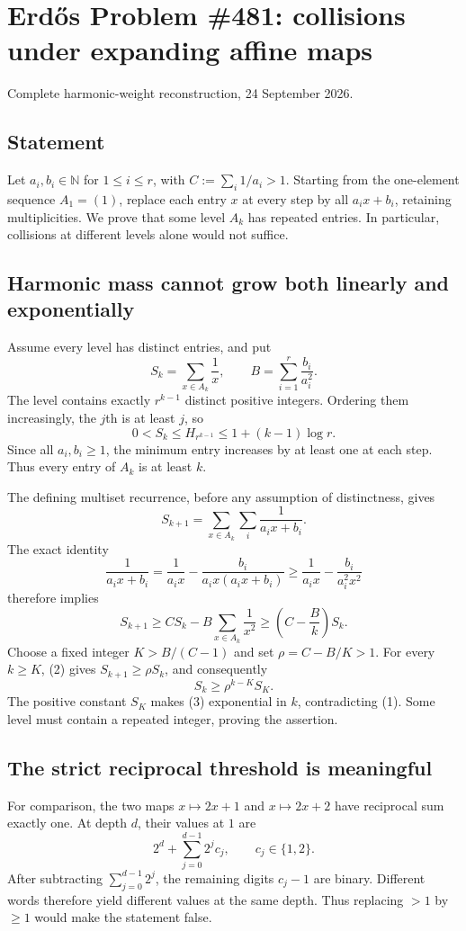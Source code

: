\section{Erd\H{o}s Problem \#481: collisions under expanding affine maps}
\noindent Complete harmonic-weight reconstruction, 24 September 2026.

\subsection*{Statement}
Let $a_i,b_i\in\mathbb N$ for $1\le i\le r$, with $C:=\sum_i1/a_i>1$. Starting from the one-element sequence $A_1=(1)$, replace each entry $x$ at every step by all $a_ix+b_i$, retaining multiplicities. We prove that some level $A_k$ has repeated entries. In particular, collisions at different levels alone would not suffice.

\subsection*{Harmonic mass cannot grow both linearly and exponentially}
Assume every level has distinct entries, and put
\[S_k=\sum_{x\in A_k}\frac1x,\qquad B=\sum_{i=1}^r\frac{b_i}{a_i^2}.\]
The level contains exactly $r^{k-1}$ distinct positive integers. Ordering them increasingly, the $j$th is at least $j$, so
\[0<S_k\le H_{r^{k-1}}\le1+(k-1)\log r.\tag{1}\]
Since all $a_i,b_i\ge1$, the minimum entry increases by at least one at each step. Thus every entry of $A_k$ is at least $k$.

The defining multiset recurrence, before any assumption of distinctness, gives
\[S_{k+1}=\sum_{x\in A_k}\sum_i\frac1{a_ix+b_i}.
\]
The exact identity
\[\frac1{a_ix+b_i}=\frac1{a_ix}-\frac{b_i}{a_ix(a_ix+b_i)}
\ge\frac1{a_ix}-\frac{b_i}{a_i^2x^2}
\]
therefore implies
\[S_{k+1}\ge C S_k-B\sum_{x\in A_k}\frac1{x^2}
\ge\left(C-\frac Bk\right)S_k.\tag{2}\]
Choose a fixed integer $K>B/(C-1)$ and set $\rho=C-B/K>1$. For every $k\ge K$, (2) gives $S_{k+1}\ge\rho S_k$, and consequently
\[S_k\ge\rho^{k-K}S_K.\tag{3}\]
The positive constant $S_K$ makes (3) exponential in $k$, contradicting (1). Some level must contain a repeated integer, proving the assertion.

\subsection*{The strict reciprocal threshold is meaningful}
For comparison, the two maps $x\mapsto2x+1$ and $x\mapsto2x+2$ have reciprocal sum exactly one. At depth $d$, their values at $1$ are
\[2^d+\sum_{j=0}^{d-1}2^j c_j,\qquad c_j\in\{1,2\}.
\]
After subtracting $\sum_{j=0}^{d-1}2^j$, the remaining digits $c_j-1$ are binary. Different words therefore yield different values at the same depth. Thus replacing $>1$ by $\ge1$ would make the statement false.

